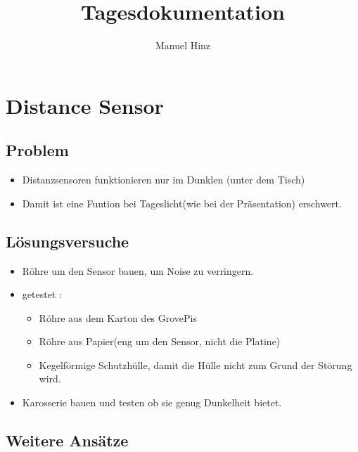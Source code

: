 \documentclass{article}
\author{Manuel Hinz}
\title{Tagesdokumentation}
\begin{document}
\maketitle

\section{Distance Sensor}

\subsection{Problem}

\begin{itemize}

\item Distanzsensoren funktionieren nur im Dunklen (unter dem Tisch)

\item Damit ist eine Funtion bei Tageslicht(wie bei der Präsentation) erschwert. 

\end{itemize}

\subsection{Lösungsversuche}

\begin{itemize}

\item Röhre um den Sensor bauen, um Noise zu verringern.

\item getestet :
\begin{itemize}

\item Röhre aus dem Karton des GrovePis

\item Röhre aus Papier(eng um den Sensor, nicht die Platine)

\item Kegelförmige Schutzhülle, damit die Hülle nicht zum Grund der Störung wird. 

\end{itemize} 

\item Karosserie bauen und testen ob sie genug Dunkelheit bietet.

\end{itemize}

\subsection{Weitere Ansätze}
\end{document}
